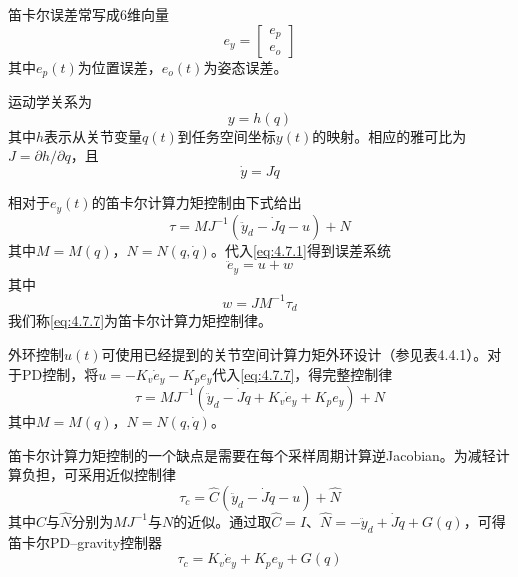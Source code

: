 \documentclass[UTF8]{ctexart}
\theoremstyle{definition}
\begin{document}
笛卡尔误差常写成6维向量
\begin{equation}\label{eq:4.7.4}
    e_y = \begin{bmatrix} e_p \\ e_o \end{bmatrix}
\end{equation}
其中$e_p(t)$为位置误差，$e_o(t)$为姿态误差。

运动学关系为
\begin{equation}\label{eq:4.7.5}
    y = h(q)
\end{equation}
其中$h$表示从关节变量$q(t)$到任务空间坐标$y(t)$的映射。相应的雅可比为$J = \partial h/\partial q$，且
\begin{equation}\label{eq:4.7.6}
    \dot{y} = J\dot{q}
\end{equation}

相对于$e_y(t)$的笛卡尔计算力矩控制由下式给出
\begin{equation}\label{eq:4.7.7}
    \tau = M J^{-1} (\ddot{y}_d - \dot{J}\dot{q} - u) + N
\end{equation}
其中$M=M(q)$，$N=N(q,\dot{q})$。代入\eqref{eq:4.7.1}得到误差系统
\begin{equation}\label{eq:4.7.8}
    \ddot{e}_y = u + w
\end{equation}
其中
\begin{equation}\label{eq:4.7.9}
    w = JM^{-1}\tau_d
\end{equation}
我们称\eqref{eq:4.7.7}为笛卡尔计算力矩控制律。

外环控制$u(t)$可使用已经提到的关节空间计算力矩外环设计（参见表4.4.1）。对于PD控制，将$u=-K_v\dot{e}_y-K_pe_y$代入\eqref{eq:4.7.7}，得完整控制律
\begin{equation}\label{eq:4.7.10}
    \tau = M J^{-1}\left(\ddot{y}_d - \dot{J}\dot{q} + K_v\dot{e}_y + K_pe_y\right) + N
\end{equation}
其中$M=M(q)$，$N=N(q,\dot{q})$。

笛卡尔计算力矩控制的一个缺点是需要在每个采样周期计算逆Jacobian。为减轻计算负担，可采用近似控制律
\begin{equation}\label{eq:4.7.11}
    \tau_c = \hat{C}\left(\ddot{y}_d - \dot{J}\dot{q} - u\right) + \hat{N}
\end{equation}
其中$\hat{C}$与$\hat{N}$分别为$MJ^{-1}$与$N$的近似。通过取$\hat{C}=I$、$\hat{N}=-\ddot{y}_d+\dot{J}\dot{q}+G(q)$，可得笛卡尔PD–gravity控制器
\begin{equation}\label{eq:4.7.12}
    \tau_c = K_v\dot{e}_y + K_pe_y + G(q)
\end{equation}
\end{document}
